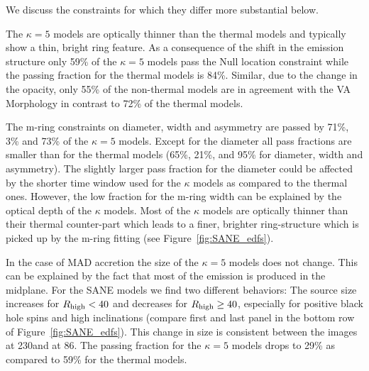 We discuss the constraints for which they differ more substantial below.


The $\kappa=5$ models are optically thinner than the thermal models and typically show a thin, bright ring feature.
As a consequence of the shift in the emission structure only 59\% of the $\kappa=5$ models pass the Null location constraint while the passing fraction for the thermal models is 84\%.
Similar, due to the change in the opacity, only 55\% of the non-thermal models are in agreement with the VA Morphology in contrast to 72\% of the thermal models.


The m-ring constraints on diameter, width and asymmetry are passed by 71\%, 3\% and 73\% of the $\kappa=5$ models.
Except for the diameter all pass fractions are smaller than for the thermal models (65\%, 21\%, and 95\% for diameter, width and asymmetry).
The slightly larger pass fraction for the diameter could be affected by the shorter time window used for the $\kappa$ models as compared to the thermal ones.
However, the low fraction for the m-ring width can be explained by the optical depth of the $\kappa$ models.
Most of the $\kappa$ models are optically thinner than their thermal counter-part which leads to a finer, brighter ring-structure which is picked up by the m-ring fitting (see Figure~\ref{fig:SANE_edfs}).


In the case of MAD accretion the size of the $\kappa=5$ models does not change.
This can be explained by the fact that most of the emission is produced in the midplane.
For the SANE models we find two different behaviors: The source size increases for $R_\mathrm{high} < 40$ and decreases for $R_\mathrm{high} \geq 40$, especially for positive black hole spins and high inclinations (compare first and last panel in the bottom row of Figure~\ref{fig:SANE_edfs}).
This change in size is consistent between the images at 230\GHz and at 86\GHz.
The passing fraction for the $\kappa=5$ models drops to 29\% as compared to 59\% for the thermal models.


